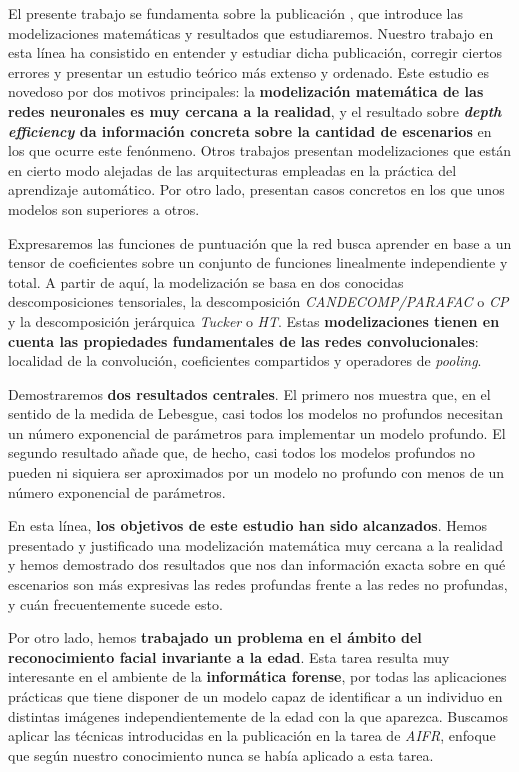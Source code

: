 El presente trabajo se fundamenta sobre la publicación \cite{matematicas:principal}, que introduce las modelizaciones matemáticas y resultados que estudiaremos. Nuestro trabajo en esta línea ha consistido en entender y estudiar dicha publicación, corregir ciertos errores y presentar un estudio teórico más extenso y ordenado. Este estudio es novedoso por dos motivos principales: la \textbf{modelización matemática de las redes neuronales es muy cercana a la realidad}, y el resultado sobre \textbf{\textit{depth efficiency} da información concreta sobre la cantidad de escenarios} en los que ocurre este fenónmeno. Otros trabajos presentan modelizaciones que están en cierto modo alejadas de las arquitecturas empleadas en la práctica del aprendizaje automático. Por otro lado, presentan casos concretos en los que unos modelos son superiores a otros.

Expresaremos las funciones de puntuación que la red busca aprender en base a un tensor de coeficientes sobre un conjunto de funciones linealmente independiente y total. A partir de aquí, la modelización se basa en dos conocidas descomposiciones tensoriales, la descomposición \textit{CANDECOMP/PARAFAC} o \textit{CP} y la descomposición jerárquica \textit{Tucker} o \textit{HT}. Estas \textbf{modelizaciones tienen en cuenta las propiedades fundamentales de las redes convolucionales}: localidad de la convolución, coeficientes compartidos y operadores de \textit{pooling}.

Demostraremos \textbf{dos resultados centrales}. El primero nos muestra que, en el sentido de la medida de Lebesgue, casi todos los modelos no profundos necesitan un número exponencial de parámetros para implementar un modelo profundo. El segundo resultado añade que, de hecho, casi todos los modelos profundos no pueden ni siquiera ser aproximados por un modelo no profundo con menos de un número exponencial de parámetros.

En esta línea, \textbf{los objetivos de este estudio han sido alcanzados}. Hemos presentado y justificado una modelización matemática muy cercana a la realidad y hemos demostrado dos resultados que nos dan información exacta sobre en qué escenarios son más expresivas las redes profundas frente a las redes no profundas, y cuán frecuentemente sucede esto.

Por otro lado, hemos \textbf{trabajado un problema en el ámbito del reconocimiento facial invariante a la edad}. Esta tarea resulta muy interesante en el ambiente de la \textbf{informática forense}, por todas las aplicaciones prácticas que tiene disponer de un modelo capaz de identificar a un individuo en distintas imágenes independientemente de la edad con la que aparezca. Buscamos aplicar las técnicas introducidas en la publicación \cite{informatica:principal} en la tarea de \textit{AIFR}, enfoque que según nuestro conocimiento nunca se había aplicado a esta tarea.

